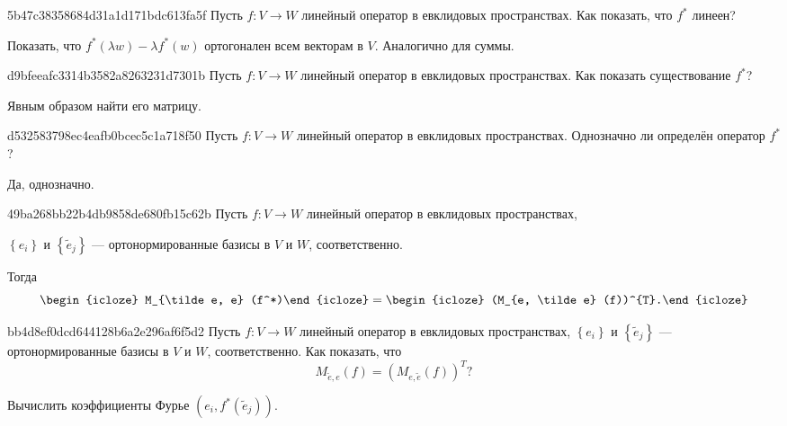 \begin{note}{5b47c38358684d31a1d171bdc613fa5f}
    Пусть \({ f: V \to W }\) линейный оператор в евклидовых пространствах.
    Как показать, что \({ f^* }\) линеен?

    \begin{cloze}{1}
        Показать, что \({ f^*(\lambda w) - \lambda f^* (w) }\) ортогонален всем векторам в \({ V }\). Аналогично для суммы.
    \end{cloze}
\end{note}

\begin{note}{d9bfeeafc3314b3582a8263231d7301b}
    Пусть \({ f: V \to W }\) линейный оператор в евклидовых пространствах.
    Как показать существование \({ f^* }\)?

    \begin{cloze}{1}
        Явным образом найти его матрицу.
    \end{cloze}
\end{note}

\begin{note}{d532583798ec4eafb0bcec5c1a718f50}
    Пусть \({ f: V \to W }\) линейный оператор в евклидовых пространствах.
    Однозначно ли определён оператор \({ f^* }\)?

    \begin{cloze}{1}
        Да, однозначно.
    \end{cloze}
\end{note}

\begin{note}{49ba268bb22b4db9858de680fb15c62b}
    Пусть \({ f: V \to W }\) линейный оператор в евклидовых пространствах, \begin{icloze}{3}\({ \left\{ e_i \right\} }\) и \({ \left\{ \tilde e_j \right\} }\) --- ортонормированные базисы в \({ V }\) и \({ W }\), соответственно.\end{icloze}
    Тогда
    \[
        \begin{icloze}{2}M_{\tilde e, e} (f^*)\end{icloze} = \begin{icloze}{1}(M_{e, \tilde e} (f))^{T}.\end{icloze}
    \]
\end{note}

\begin{note}{bb4d8ef0dcd644128b6a2e296af6f5d2}
    Пусть \({ f: V \to W }\) линейный оператор в евклидовых пространствах, \({ \left\{ e_i \right\} }\) и \({ \left\{ \tilde e_j \right\} }\) --- ортонормированные базисы в \({ V }\) и \({ W }\), соответственно.
    Как показать, что
    \[
        M_{\tilde e, e} (f) = (M_{e, \tilde e} (f))^{T}?
    \]

    \begin{cloze}{1}
        Вычислить коэффициенты Фурье \({ (e_i, f^*(\tilde e_j)) }\).
    \end{cloze}
\end{note}

